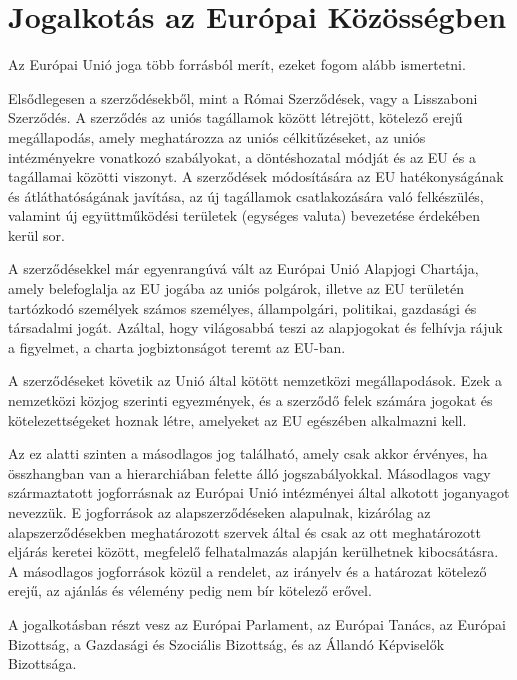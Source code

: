 \section{Jogalkotás az Európai Közösségben}

Az Európai Unió joga több forrásból merít, ezeket fogom alább ismertetni. \cite{EU-jog}

Elsődlegesen a szerződésekből, mint a Római Szerződések, vagy a Lisszaboni Szerződés. A szerződés az uniós tagállamok között létrejött, kötelező erejű megállapodás, amely meghatározza az uniós célkitűzéseket, az uniós intézményekre vonatkozó szabályokat, a döntéshozatal módját és az EU és a tagállamai közötti viszonyt. A szerződések módosítására az EU hatékonyságának és átláthatóságának javítása, az új tagállamok csatlakozására való felkészülés, valamint új együttműködési területek (egységes valuta) bevezetése érdekében kerül sor. \cite{EU-szerzodesek}

A szerződésekkel már egyenrangúvá vált az Európai Unió Alapjogi Chartája, amely belefoglalja az EU jogába az uniós polgárok, illetve az EU területén tartózkodó személyek számos személyes, állampolgári, politikai, gazdasági és társadalmi jogát. Azáltal, hogy világosabbá teszi az alapjogokat és felhívja rájuk a figyelmet, a charta jogbiztonságot teremt az EU-ban. \cite{EU-charta}

A szerződéseket követik az Unió által kötött nemzetközi megállapodások. Ezek a nemzetközi közjog szerinti egyezmények, és a szerződő felek számára jogokat és kötelezettségeket hoznak létre, amelyeket az EU egészében alkalmazni kell. \cite{EU-nemzetkozi}

Az ez alatti szinten a másodlagos jog található, amely csak akkor érvényes, ha összhangban van a hierarchiában felette álló jogszabályokkal. Másodlagos vagy származtatott jogforrásnak az Európai Unió intézményei által alkotott joganyagot nevezzük. E jogforrások az alapszerződéseken alapulnak, kizárólag az alapszerződésekben meghatározott szervek által és csak az ott meghatározott eljárás keretei között, megfelelő felhatalmazás alapján kerülhetnek kibocsátásra. A másodlagos jogforrások közül a rendelet, az irányelv és a határozat kötelező erejű, az ajánlás és vélemény pedig nem bír kötelező erővel. \cite{EU-masodlagos}

A jogalkotásban részt vesz az Európai Parlament, az Európai Tanács, az Európai Bizottság, a Gazdasági és Szociális Bizottság, és az Állandó Képviselők Bizottsága.